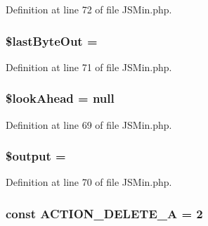 Definition at line 72 of file J\+S\+Min.\+php.

\subsubsection[{\texorpdfstring{\$last\+Byte\+Out}{$lastByteOut}}]{\setlength{\rightskip}{0pt plus 5cm}\$last\+Byte\+Out = \textquotesingle{}\textquotesingle{}\hspace{0.3cm}{\ttfamily [protected]}}\hypertarget{class_j_s_min_a0ae49b54f772427d2f2f9dfa2c1db69e}{}\label{class_j_s_min_a0ae49b54f772427d2f2f9dfa2c1db69e}


Definition at line 71 of file J\+S\+Min.\+php.

\subsubsection[{\texorpdfstring{\$look\+Ahead}{$lookAhead}}]{\setlength{\rightskip}{0pt plus 5cm}\$look\+Ahead = null\hspace{0.3cm}{\ttfamily [protected]}}\hypertarget{class_j_s_min_a58a4c0ac1cdec8877b44e8e692f0ab77}{}\label{class_j_s_min_a58a4c0ac1cdec8877b44e8e692f0ab77}


Definition at line 69 of file J\+S\+Min.\+php.

\subsubsection[{\texorpdfstring{\$output}{$output}}]{\setlength{\rightskip}{0pt plus 5cm}\$output = \textquotesingle{}\textquotesingle{}\hspace{0.3cm}{\ttfamily [protected]}}\hypertarget{class_j_s_min_a73004ce9cd673c1bfafd1dc351134797}{}\label{class_j_s_min_a73004ce9cd673c1bfafd1dc351134797}


Definition at line 70 of file J\+S\+Min.\+php.

\subsubsection[{\texorpdfstring{A\+C\+T\+I\+O\+N\+\_\+\+D\+E\+L\+E\+T\+E\+\_\+A}{ACTION_DELETE_A}}]{\setlength{\rightskip}{0pt plus 5cm}const A\+C\+T\+I\+O\+N\+\_\+\+D\+E\+L\+E\+T\+E\+\_\+A = 2}\hypertarget{class_j_s_min_adb0de6d559c4d935f62fcaa0bf80a55d}{}\label{class_j_s_min_adb0de6d559c4d935f62fcaa0bf80a55d}


